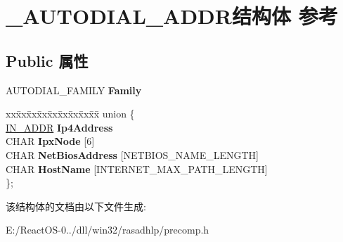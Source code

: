 \hypertarget{struct___a_u_t_o_d_i_a_l___a_d_d_r}{}\section{\+\_\+\+A\+U\+T\+O\+D\+I\+A\+L\+\_\+\+A\+D\+D\+R结构体 参考}
\label{struct___a_u_t_o_d_i_a_l___a_d_d_r}
\subsection*{Public 属性}
\begin{DoxyCompactItemize}
\item 
\mbox{\label{struct___a_u_t_o_d_i_a_l___a_d_d_r_aeff9bbcaf98fdc986fd8524b0dbbb19f}} 
A\+U\+T\+O\+D\+I\+A\+L\+\_\+\+F\+A\+M\+I\+LY {\bfseries Family}
\item 
\mbox{\label{struct___a_u_t_o_d_i_a_l___a_d_d_r_a09b285f30d1b3c313704f782c38a18a0}} 
\begin{tabbing}
xx\=xx\=xx\=xx\=xx\=xx\=xx\=xx\=xx\=\kill
union \{\\
\>\hyperlink{structin__addr}{IN\_ADDR} {\bfseries Ip4Address}\\
\>CHAR {\bfseries IpxNode} \mbox{[}6\mbox{]}\\
\>CHAR {\bfseries NetBiosAddress} \mbox{[}NETBIOS\_NAME\_LENGTH\mbox{]}\\
\>CHAR {\bfseries HostName} \mbox{[}INTERNET\_MAX\_PATH\_LENGTH\mbox{]}\\
\}; \\

\end{tabbing}\end{DoxyCompactItemize}


该结构体的文档由以下文件生成\+:\begin{DoxyCompactItemize}
\item 
E\+:/\+React\+O\+S-\/0../dll/win32/rasadhlp/precomp.\+h\end{DoxyCompactItemize}
